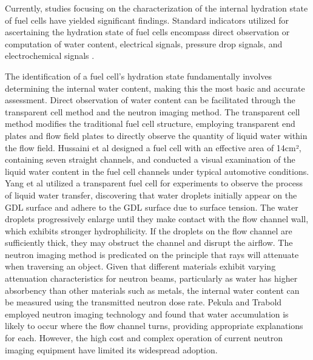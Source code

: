 Currently, studies focusing on the characterization of the internal hydration state of fuel cells have yielded significant findings. Standard indicators utilized for ascertaining the hydration state of fuel cells encompass direct observation or computation of water content, electrical signals, pressure drop signals, and electrochemical signals \cite{hussainiVisualizationQuantificationCathode2009}.
\par
The identification of a fuel cell's hydration state fundamentally involves determining the internal water content, making this the most basic and accurate assessment. Direct observation of water content can be facilitated through the transparent cell method and the neutron imaging method. The transparent cell method modifies the traditional fuel cell structure, employing transparent end plates and flow field plates to directly observe the quantity of liquid water within the flow field\cite{leeVisualizationFloodingSingle2012}. Hussaini et al\cite{hussainiVisualizationQuantificationCathode2009} designed a fuel cell with an effective area of 14cm², containing seven straight channels, and conducted a visual examination of the liquid water content in the fuel cell channels under typical automotive conditions. Yang et al\cite{yangVisualizationLiquidWater2004} utilized a transparent fuel cell for experiments to observe the process of liquid water transfer, discovering that water droplets initially appear on the GDL surface and adhere to the GDL surface due to surface tension. The water droplets progressively enlarge until they make contact with the flow channel wall, which exhibits stronger hydrophilicity. If the droplets on the flow channel are sufficiently thick, they may obstruct the channel and disrupt the airflow. The neutron imaging method is predicated on the principle that rays will attenuate when traversing an object. Given that different materials exhibit varying attenuation characteristics for neutron beams, particularly as water has higher absorbency than other materials such as metals, the internal water content can be measured using the transmitted neutron dose rate. Pekula\cite{pekulaStudyWaterDistribution2005} and Trabold\cite{traboldSituInvestigationWater2006} employed neutron imaging technology and found that water accumulation is likely to occur where the flow channel turns, providing appropriate explanations for each. However, the high cost and complex operation of current neutron imaging equipment have limited its widespread adoption.
